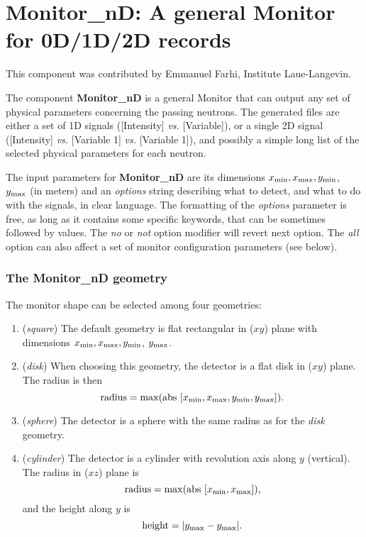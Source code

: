 \section{Monitor\_nD: A general Monitor for 0D/1D/2D records}
\label{s:monitornd}

This component was contributed by Emmanuel Farhi, Institute
Laue-Langevin.

The component {\bf Monitor\_nD} is a general Monitor that can output any
set of physical parameters concerning the passing neutrons. The
generated files are either a set of 1D signals ([Intensity] {\it vs.}
[Variable]), or a single 2D signal ([Intensity] {\it vs.} [Variable 1]
{\it vs.} [Variable 1]), and possibly a simple long list of the selected
physical parameters for each neutron.

The input parameters for {\bf Monitor\_nD} are its dimensions $x_{\rm
  min}, x_{\rm max}, y_{\rm min}$, $y_{\rm max}$ (in meters) and an {\it
  options} string describing what to detect, and what to do with the
signals, in clear language. The formatting of the {\it options}
parameter is free, as long as it contains some specific keywords, that
can be sometimes followed by values. The {\it no} or {\it not} option
modifier will revert next option. The {\it all} option can also affect a
set of monitor configuration parameters (see below).

\subsubsection{The Monitor\_nD geometry}

The monitor shape can be selected among four geometries:
\begin{enumerate}
\item{({\it square}) The default geometry is flat rectangular in ($xy$)
    plane with dimensions $x_{\rm min}, x_{\rm max}, y_{\rm min}$,
    $y_{\rm max}$.}
\item{({\it disk}) When choosing this geometry, the detector is a flat
    disk in ($xy$) plane. The radius is then
    \begin{equation}
      \mbox{radius} = \max ( \mbox{abs } [ x_{\rm min}, x_{\rm max}, y_{\rm
        min}, y_{\rm max} ] ).
    \end{equation}
    }
\item{({\it sphere}) The detector is a sphere with the same radius as
    for the {\it disk} geometry.}
\item{({\it cylinder}) The detector is a cylinder with revolution axis
    along $y$ (vertical). The radius in ($xz$) plane is
    \begin{equation}
      \mbox{radius} =  \max ( \mbox{abs } [ x_{\rm min}, x_{\rm max} ] ),
    \end{equation}
    and the height along $y$ is 
    \begin{equation}
      \mbox{height} =  | y_{\rm max} - y_{\rm max} |.
    \end{equation}
    }
\end{enumerate}

